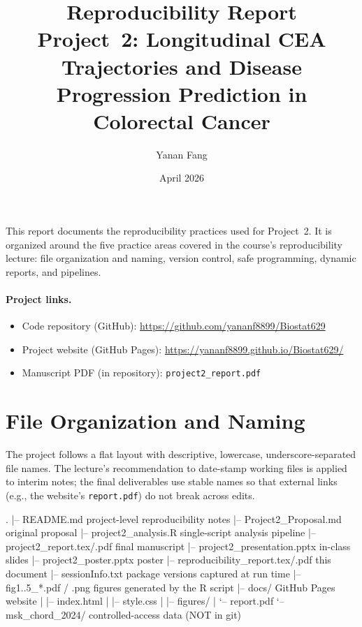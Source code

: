 \documentclass[11pt]{article}
\title{Reproducibility Report \\ \large Project~2: Longitudinal CEA Trajectories and Disease Progression Prediction in Colorectal Cancer}
\author{Yanan Fang}
\date{April 2026}
\begin{document}
\maketitle

This report documents the reproducibility practices used for Project~2. It is organized around the five practice areas covered in the course's reproducibility lecture: file organization and naming, version control, safe programming, dynamic reports, and pipelines.

\paragraph{Project links.}
\begin{itemize}[leftmargin=*]
  \item Code repository (GitHub): \url{https://github.com/yananf8899/Biostat629}
  \item Project website (GitHub Pages): \url{https://yananf8899.github.io/Biostat629/}
  \item Manuscript PDF (in repository): \texttt{project2\_report.pdf}
\end{itemize}

\section{File Organization and Naming}

The project follows a flat layout with descriptive, lowercase, underscore-separated file names. The lecture's recommendation to date-stamp working files is applied to interim notes; the final deliverables use stable names so that external links (e.g., the website's \texttt{report.pdf}) do not break across edits.

\begin{code}
.
|-- README.md                   project-level reproducibility notes
|-- Project2_Proposal.md        original proposal
|-- project2_analysis.R         single-script analysis pipeline
|-- project2_report.tex/.pdf    final manuscript
|-- project2_presentation.pptx  in-class slides
|-- project2_poster.pptx        poster
|-- reproducibility_report.tex/.pdf  this document
|-- sessionInfo.txt             package versions captured at run time
|-- fig{1..5}_*.pdf / .png      figures generated by the R script
|-- docs/                       GitHub Pages website
|   |-- index.html
|   |-- style.css
|   |-- figures/
|   `-- report.pdf
`-- msk_chord_2024/             controlled-access data (NOT in git)
\end{code}
\end{document}
